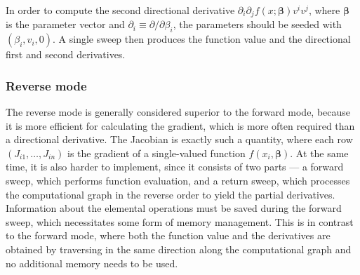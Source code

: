\documentclass{article}
\begin{document}
In order to compute the second directional derivative $\partial_i\partial_j f(x; \bm\beta) v^iv^j$, where $\bm\beta$ is the parameter vector and $\partial_i \equiv \partial/\partial\beta_i$, the parameters should be seeded with $(\beta_i, v_i, 0)$. A single sweep then produces the function value and the directional first and second derivatives.

\subsubsection{Reverse mode}

The reverse mode is generally considered superior to the forward mode, because it is more efficient for calculating the gradient, which is more often required than a directional derivative. The Jacobian is exactly such a quantity, where each row $(J_{i1}, \ldots, J_{in})$ is the gradient of a single-valued function $f(x_i, \bm\beta)$. At the same time, it is also harder to implement, since it consists of two parts --- a forward sweep, which performs function evaluation, and a return sweep, which processes the computational graph in the reverse order to yield the partial derivatives. Information about the elemental operations must be saved during the forward sweep, which necessitates some form of memory management. This is in contrast to the forward mode, where both the function value and the derivatives are obtained by traversing in the same direction along the computational graph and no additional memory needs to be used.
\end{document}

